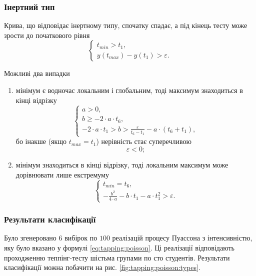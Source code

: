 \subsubsection{Інертний тип}
Крива, що відповідає інертному типу, спочатку спадає,
а під кінець тесту може зрости до початкового рівня
\begin{equation*}
  \begin{cases}
    t_{min} > t_1, \\
    y\left( t_{max} \right) - y\left( t_1 \right) > \varepsilon.
  \end{cases}
\end{equation*}

Можливі два випадки
\begin{enumerate}
  \item
    мінімум є водночас локальним і глобальним, тоді максимум знаходиться в кінці
    відрізку
    \begin{equation*}
      \begin{cases}
        a > 0, \\
        b \ge - 2 \cdot a \cdot t_6, \\
        - 2 \cdot a \cdot t_1
        > b > \frac{\varepsilon}{t_6 - t_1} - a \cdot \left( t_6 + t_1 \right),
      \end{cases}
    \end{equation*}
    бо інакше (якщо $t_{max} = t_1$) нерівність стає суперечливою
    \begin{equation*}
      \varepsilon < 0;
    \end{equation*}
  \item
    мінімум знаходиться в кінці відрізку, тоді локальним максимум може
    дорівнювати лише екстремуму
    \begin{equation*}
      \begin{cases}
        t_{min} = t_6, \\
        - \frac{b^2}{4 \cdot a} - b \cdot t_1 - a \cdot t_1^2 > \varepsilon.
      \end{cases}
    \end{equation*}
\end{enumerate}

\subsubsection{Результати класифікації}
Було згенеровано $6$ вибірок по $100$ реалізацій процесу Пуассона з
інтенсивністю, яку було вказано у формулі \eqref{eq:tapping:poisson}.
Ці реалізації відповідають проходженню теппінг-тесту шістьма групами по сто
студентів.
Результати класифікації можна побачити на рис. \ref{fig:tapping:poisson:types}.

